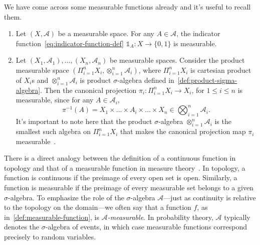 \begin{example}
    We have come across some measurable functions already and it's useful to recall them.
    \label{ex:measurable-functions}

    \begin{enumerate}
        \item Let $(X, \mathcal{A})$ be a measurable space. For any $A \in \mathcal{A}$, the indicator function~\ref{eq:indicator-function-def} $\mathds{1}_A: X \to \{0, 1\}$ is measurable.
        \item Let $(X_1, \mathcal{A}_1), \dots, (X_n, \mathcal{A}_n)$ be measurable spaces. Consider the product measurable space $(\Pi_{i=1}^n X_i, \otimes_{i=1}^n \mathcal{A}_i)$, where $\Pi_{i=1}^n X_i$ is cartesian product of $X_i$s and $\otimes_{i=1}^n \mathcal{A}_i$ is product $\sigma$-algebra defined in~\ref{def:product-sigma-algebra}. Then the canonical projection $\pi_i: \Pi_{i=1}^n X_i \to X_i$, for $1 \leq i \leq n$ is measurable, since for any $A \in \mathcal{A}_i$,
        \[
            \pi^{-1}(A) = X_1 \times \dots \times A_i \times \dots \times X_n \in \bigotimes_{i=1}^n \mathcal{A}_i.
        \]
        It's important to note here that the product $\sigma$-algebra $\otimes_{i=1}^n \mathcal{A}_i$ is the smallest such algebra on $\Pi_{i=1}^n X_i$ that makes the canonical projection map $\pi_i$ measurable~\cite[\S 8.1, p.243]{MeasureTheoryCohn}.
    \end{enumerate}

\end{example}

There is a direct analogy between the definition of a continuous function in topology and that of a measurable function in measure theory~\cite[Cor.~2.2]{FollandRealAnalysis}. In topology, a function is continuous if the preimage of every open set is open. Similarly, a function is measurable if the preimage of every measurable set belongs to a given $\sigma$-algebra. To emphasize the role of the $\sigma$-algebra $\mathcal{A}$—just as continuity is relative to the topology on the domain—we often say that a function $f$, as in~\ref{def:measurable-function}, is \emph{$\mathcal{A}$-measurable}. In probability theory, $\mathcal{A}$ typically denotes the $\sigma$-algebra of events, in which case measurable functions correspond precisely to random variables.

